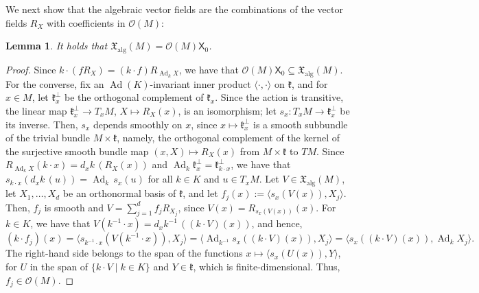 \documentclass{article}
\newcommand{\frakk}{\mathfrak{k}}
\newcommand{\xalg}{\mathfrak X_{\mathrm{alg}}}
\newcommand{\sX}{\mathsf{X}}
\newcommand{\Ocal}{\mathcal{O}}
\newtheorem{lemma}{Lemma}
\theoremstyle{definition}
\theoremstyle{plain}
\begin{document}
We next show that the algebraic vector fields are the combinations of the vector fields $R_X$ with coefficients in $\Ocal(M)$:

\begin{lemma}\label{lem:tangent}
It holds that $\xalg(M)=\Ocal(M)\sX_0$.
\end{lemma}

\begin{proof}
Since $k\cdot(fR_X)=(k\cdot f)R_{\operatorname{Ad}_kX}$, we have that $\Ocal(M)\sX_0\subseteq\xalg(M)$.
For the converse, fix an $\operatorname{Ad}(K)$-invariant inner product $\langle\cdot,\cdot\rangle$ on $\frakk$,
and for $x\in M$, let $\frakk_x^\perp$ be the orthogonal complement of $\frakk_x$.
Since the action is transitive, the linear map $\frakk_x^\perp\to T_xM$, $X\mapsto R_X(x)$, is an isomorphism; let $s_x\colon T_xM\to\frakk_x^\perp$ be its inverse.
Then, $s_x$ depends smoothly on $x$, since $x\mapsto\frakk_x^\perp$ is a smooth subbundle of the trivial bundle $M\times\frakk$, namely, the orthogonal complement of the kernel of the surjective smooth bundle map $(x,X)\mapsto R_X(x)$ from $M\times\frakk$ to $TM$.
Since $R_{\operatorname{Ad}_kX}(k\cdot x)=d_xk\,(R_X(x))$ and $\operatorname{Ad}_k\frakk_x^\perp=\frakk_{k\cdot x}^\perp$, we have that $s_{k\cdot x}(d_xk\,(u))=\operatorname{Ad}_k\,s_x(u)$ for all $k\in K$ and $u\in T_xM$.
Let $V\in\xalg(M)$, let $X_1,\ldots,X_d$ be an orthonormal basis of $\frakk$, and let $f_j(x):=\langle s_x(V(x)),X_j\rangle$.
Then, $f_j$ is smooth and $V=\sum_{j=1}^df_jR_{X_j}$, since $V(x)=R_{s_x(V(x))}(x)$.
For $k\in K$, we have that $V(k^{-1}\cdot x)=d_xk^{-1}\,((k \cdot V)(x))$, and hence,
$$
(k\cdot f_j)(x)=\langle s_{k^{-1} \cdot x}(V(k^{-1}\cdot x)),X_j\rangle
=\langle\operatorname{Ad}_{k^{-1}} s_x((k \cdot V)(x)),X_j\rangle
=\langle s_x((k\cdot V)(x)),\operatorname{Ad}_k X_j\rangle.
$$
The right-hand side belongs to the span of the functions $x\mapsto\langle s_x(U(x)),Y\rangle$, for $U$ in the span of $\{k\cdot V\mid k\in K\}$ and $Y\in\frakk$, which is finite-dimensional. Thus, $f_j\in\Ocal(M)$.
\end{proof}
\end{document}
